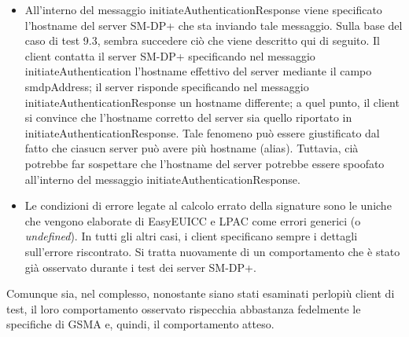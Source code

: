 \documentclass[10pt, oneside]{book}
\begin{document}
\begin{itemize}
\item All'interno del messaggio initiateAuthenticationResponse viene specificato l'hostname del server SM-DP+ che sta inviando tale messaggio. Sulla base del caso di test 9.3, sembra succedere ciò che viene descritto qui di seguito. Il client contatta il server SM-DP+ specificando nel messaggio initiateAuthentication l'hostname effettivo del server mediante il campo smdpAddress; il server risponde specificando nel messaggio initiateAuthenticationResponse un hostname differente; a quel punto, il client si convince che l'hostname corretto del server sia quello riportato in initiateAuthenticationResponse. Tale fenomeno può essere giustificato dal fatto che ciasucn server può avere più hostname (alias). Tuttavia, cià potrebbe far sospettare che l'hostname del server potrebbe essere spoofato all'interno del messaggio initiateAuthenticationResponse.
\item Le condizioni di errore legate al calcolo errato della signature sono le uniche che vengono elaborate di EasyEUICC e LPAC come errori generici (o \textit{undefined}). In tutti gli altri casi, i client specificano sempre i dettagli sull'errore riscontrato. Si tratta nuovamente di un comportamento che è stato già osservato durante i test dei server SM-DP+.
\end{itemize}
Comunque sia, nel complesso, nonostante siano stati esaminati perlopiù client di test, il loro comportamento osservato rispecchia abbastanza fedelmente le specifiche di GSMA e, quindi, il comportamento atteso.
\end{document}
